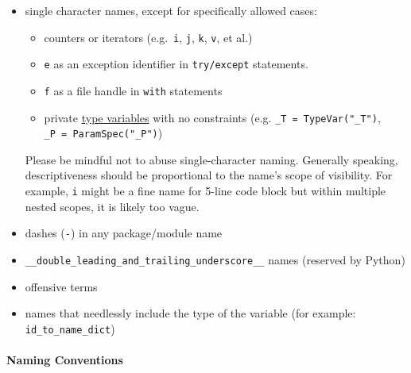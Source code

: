\documentclass[
]{article}
\providecommand{\tightlist}{%
  \setlength{\itemsep}{0pt}\setlength{\parskip}{0pt}}
\begin{document}
\begin{itemize}
\item
  single character names, except for specifically allowed cases:

  \begin{itemize}
  \tightlist
  \item
    counters or iterators (e.g.~\texttt{i}, \texttt{j}, \texttt{k},
    \texttt{v}, et al.)
  \item
    \texttt{e} as an exception identifier in \texttt{try/except}
    statements.
  \item
    \texttt{f} as a file handle in \texttt{with} statements
  \item
    private \hyperref[typing-type-var]{type variables} with no
    constraints (e.g. \texttt{\_T\ =\ TypeVar("\_T")},
    \texttt{\_P\ =\ ParamSpec("\_P")})
  \end{itemize}

  Please be mindful not to abuse single-character naming. Generally
  speaking, descriptiveness should be proportional to the name's scope
  of visibility. For example, \texttt{i} might be a fine name for 5-line
  code block but within multiple nested scopes, it is likely too vague.
\item
  dashes (\texttt{-}) in any package/module name
\item
  \texttt{\_\_double\_leading\_and\_trailing\_underscore\_\_} names
  (reserved by Python)
\item
  offensive terms
\item
  names that needlessly include the type of the variable (for example:
  \texttt{id\_to\_name\_dict})
\end{itemize}

\paragraph{Naming Conventions}
\end{document}
